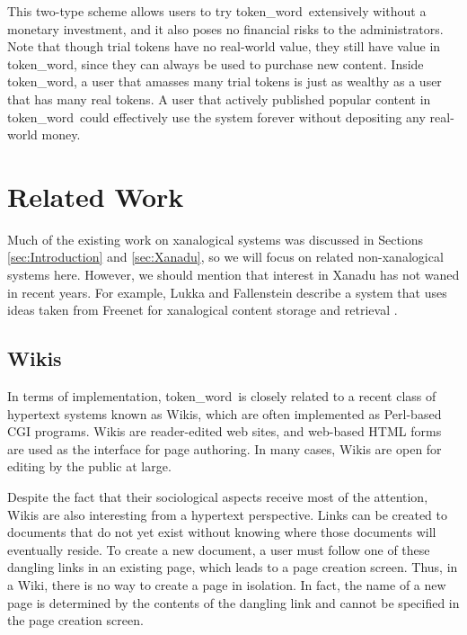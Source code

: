 \documentclass{acm_proc_article-sp}
\newcommand{\tw}{token\_word}
\begin{document}

This two-type scheme allows users to try \tw \  extensively without a monetary investment, and it also poses no financial risks to the administrators.
Note that though trial tokens have no real-world value, they still have value in \tw, since they can always be used to purchase new content.
Inside \tw, a user that amasses many trial tokens is just as wealthy as a user that has many real tokens.
A user that actively published popular content in \tw \  could effectively use the system forever without depositing any real-world money.

\section{Related Work}
\label{sec:RelatedWork}

Much of the existing work on xanalogical systems was discussed in Sections \ref{sec:Introduction} and \ref{sec:Xanadu}, so we will focus on related non-xanalogical systems here.
However, we should mention that interest in Xanadu has not waned in recent years.
For example, Lukka and Fallenstein describe a system that uses ideas taken from Freenet for xanalogical content storage and retrieval \cite{FreenetXanadu}. 


\subsection{Wikis}

In terms of implementation, \tw \  is closely related to a recent class of hypertext systems known as Wikis, which are often implemented as Perl-based CGI programs.
Wikis are reader-edited web sites, and web-based HTML forms are used as the interface for page authoring.
In many cases, Wikis are open for editing by the public at large.

Despite the fact that their sociological aspects receive most of the attention, Wikis are also interesting from a hypertext perspective.
Links can be created to documents that do not yet exist without knowing where those documents will eventually reside.
To create a new document, a user must follow one of these dangling links in an existing page, which leads to a page creation screen.
Thus, in a Wiki, there is no way to create a page in isolation.
In fact, the name of a new page is determined by the contents of the dangling link and cannot be specified in the page creation screen.
\end{document}

